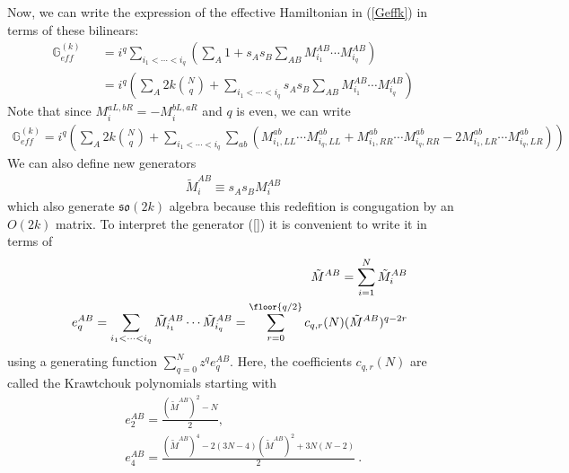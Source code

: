 \documentclass{article}
\theoremstyle{definition}
\newcommand{\nn}{\nonumber}
\newcommand{\lb}{\left(}
\newcommand{\rb}{\right)}
\begin{document}

    Now, we can write the expression of the effective Hamiltonian in (\ref{Geffk})
    in terms of these bilinears:
    \begin{eqnarray}
        \label{GeffkM} \mathbb{G}_{eff}^{(k)}&&=i^q\sum_{i_1<\cdots <i_q}\lb \sum_A
        1+s_As_B\sum_{AB}M_{i_1}^{AB}\cdots M_{i_q}^{AB}\rb\nn\\
        &&=i^q\lb \sum_A 2k{N\choose q}+\sum_{i_1<\cdots <i_q}s_As_B\sum_{AB}M_{i_1}^{AB}\cdots
        M_{i_q}^{AB}\rb
    \end{eqnarray}
    Note that since $M_{i}^{aL,bR}=-M_{i}^{bL,aR}$ and $q$ is even, we can write
    \begin{eqnarray}
        \mathbb{G}_{eff}^{(k)}=i^q\lb \sum_A 2k{N\choose q}+\sum_{i_1<\cdots <i_q}\sum_{ab}\lb
        M_{i_1,LL}^{ab}\cdots M_{i_q,LL}^{ab}+M_{i_1,RR}^{ab}\cdots M_{i_q,RR}^{ab}-2M_{i_1,LR}^{ab}\cdots
        M_{i_q,LR}^{ab}\rb\rb
    \end{eqnarray}
    We can also define new generators
    \begin{eqnarray}
        \tilde{M}^{AB}_i\equiv s_As_BM^{AB}_i
    \end{eqnarray}
    which also generate $\mathfrak{so}(2k)$ algebra because this redefition is congugation
    by an $O(2k)$ matrix. To interpret the generator (\ref{}) it is convenient
    to write it in terms of
    \begin{eqnarray}
        \label{eABq} &&\tilde{M}^{AB}=\sum_{i=1}^N \tilde{M}^{AB}_i\nn\\
        &&e^{AB}_q=\sum_{i_1<\cdots <i_q}\tilde{M}^{AB}_{i_1}\cdots \tilde{M}^{AB}_{i_q}=\sum_{r=0}^{\floor{q/2}}c_{q,r}(N)(\tilde{M}^{AB})^{q-2r}
    \end{eqnarray}
    using a generating function $\sum_{q=0}^{N}z^{q}e^{AB}_{q}$. Here, the
    coefficients $c_{q,r}(N)$ are called the Krawtchouk polynomials starting
    with
    \begin{eqnarray}
        &&e_2^{AB}=\frac{(\tilde{M}^{AB})^{2}-N}{2},\nn\\
        &&e_4^{AB}=\frac{(\tilde{M}^{AB})^{4}-2(3N-4)(\tilde{M}^{AB})^{2}+3N(N-2)}{2}\ .
    \end{eqnarray}
\end{document}
